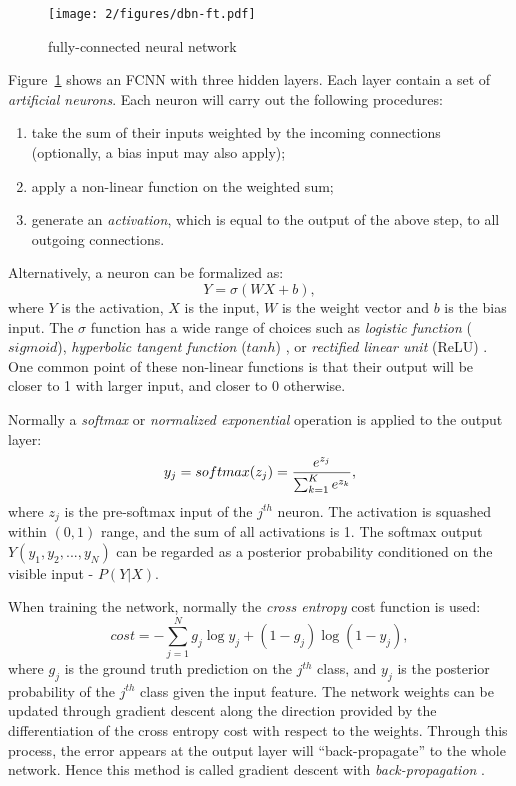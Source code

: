\begin{figure}[htb]
\centering
\texttt{[image: 2/figures/dbn-ft.pdf]}
\caption{fully-connected neural network}
\label{fig:2-dbn-ft}
\end{figure}
Figure~\ref{fig:2-dbn-ft} shows an FCNN with three hidden layers. Each layer contain a set of {\it artificial neurons}. Each neuron will carry out the following procedures:
\begin{enumerate}
\item take the sum of their inputs weighted by the incoming connections (optionally, a bias input may also apply);
\item apply a non-linear function on the weighted sum;
\item generate an {\it activation}, which is equal to the output of the above step, to all outgoing connections.
\end{enumerate}
Alternatively, a neuron can be formalized as:
\begin{equation}
Y = \sigma(WX+b),
\end{equation}
where $Y$ is the activation, $X$ is the input, $W$ is the weight vector and $b$ is the bias input. The $\sigma$ function has a wide range of choices \cite{sigtia2014improved} such as {\it logistic function} ($sigmoid$), {\it hyperbolic tangent function} ($tanh$) \cite{lecun2012efficient}, or {\it rectified linear unit} (ReLU) \cite{hahnloser2000digital}. One common point of these non-linear functions is that their output will be closer to 1 with larger input, and closer to 0 otherwise.

Normally a {\it softmax} or {\it normalized exponential} operation is applied to the output layer:
\begin{equation}
y_j = softmax(z_j)={e^{z_j} \over \sum_{k=1}^K e^{z_k}},
\end{equation}
where $z_j$ is the pre-softmax input of the $j^{th}$ neuron. The activation is squashed within $(0,1)$ range, and the sum of all activations is 1. The softmax output $Y(y_1,y_2,...,y_N)$ can be regarded as a posterior probability conditioned on the visible input - $P(Y|X)$.

When training the network, normally the {\it cross entropy} cost function \cite{murphy2012machine} is used:
\begin{equation}\label{eq:2-crossentropy}
cost = -\sum_{j=1}^N g_j\log y_j + (1-g_j)\log(1-y_j),
\end{equation}
where $g_j$ is the ground truth prediction on the $j^{th}$ class, and $y_j$ is the posterior probability of the $j^{th}$ class given the input feature. The network weights can be updated through gradient descent along the direction provided by the differentiation of the cross entropy cost with respect to the weights. Through this process, the error appears at the output layer will ``back-propagate'' to the whole network. Hence this method is called gradient descent with {\it back-propagation} \cite{rumelhart1988learning}.

